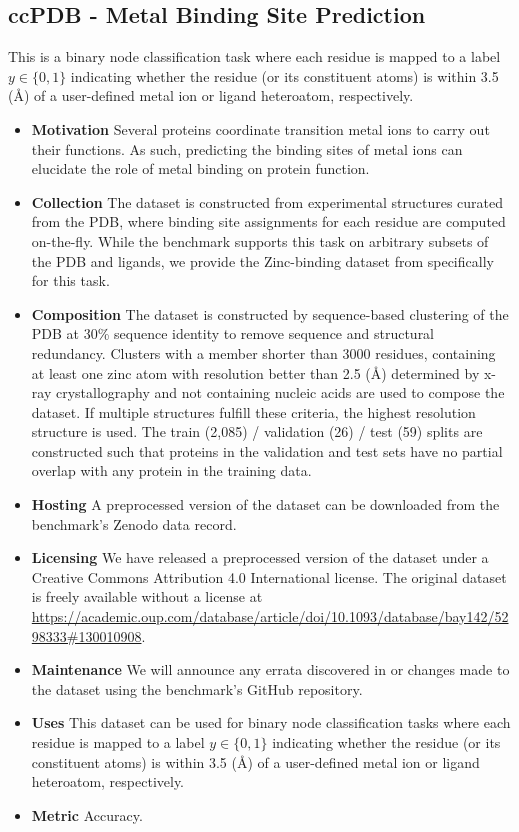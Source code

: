 \subsection{ccPDB - Metal Binding Site Prediction}
This is a binary node classification task where each residue is mapped to a label $y \in \{0, 1\}$ indicating whether the residue (or its constituent atoms) is within 3.5 (\AA) of a user-defined metal ion or ligand heteroatom, respectively.

\begin{itemize}
    \item \textbf{Motivation} Several proteins coordinate transition metal ions to carry out their functions. As such, predicting the binding sites of metal ions can elucidate the role of metal binding on protein function.
    \item \textbf{Collection} The dataset is constructed from experimental structures curated from the PDB, where binding site assignments for each residue are computed on-the-fly. While the benchmark supports this task on arbitrary subsets of the PDB and ligands, we provide the Zinc-binding dataset from \citet{Drr2023} specifically for this task.
    \item \textbf{Composition} The dataset is constructed by sequence-based clustering of the PDB at 30\% sequence identity to remove sequence and structural redundancy. Clusters with a member shorter than 3000 residues, containing at least one zinc atom with resolution better than 2.5 (\AA) determined by x-ray crystallography and not containing nucleic acids are used to compose the dataset. If multiple structures fulfill these criteria, the highest resolution structure is used. The train (2,085) / validation (26) / test (59) splits are constructed such that proteins in the validation and test sets have no partial overlap with any protein in the training data.
    \item \textbf{Hosting} A preprocessed version of the dataset can be downloaded from the benchmark's Zenodo data record.%
    \item \textbf{Licensing} We have released a preprocessed version of the dataset under a Creative Commons Attribution 4.0 International license. The original dataset is freely available without a license at \url{https://academic.oup.com/database/article/doi/10.1093/database/bay142/5298333#130010908}.
    \item \textbf{Maintenance} We will announce any errata discovered in or changes made to the dataset using the benchmark's GitHub repository.%
    \item \textbf{Uses} This dataset can be used for binary node classification tasks where each residue is mapped to a label $y \in \{0, 1\}$ indicating whether the residue (or its constituent atoms) is within 3.5 (\AA) of a user-defined metal ion or ligand heteroatom, respectively.
    \item \textbf{Metric} Accuracy.
\end{itemize}


